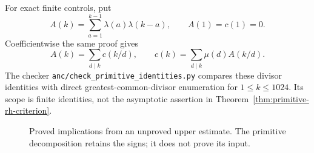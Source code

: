 For exact finite controls, put
\[
 A(k)=\sum_{a=1}^{k-1}\lambda(a)\lambda(k-a),\qquad A(1)=c(1)=0.
\]
Coefficientwise the same proof gives
\begin{equation}\label{eq:primitive-finite-controls}
 A(k)=\sum_{d\mid k}c(k/d),\qquad
 c(k)=\sum_{d\mid k}\mu(d)A(k/d).
\end{equation}
The checker \texttt{anc/check\_primitive\_identities.py} compares
these divisor identities with direct greatest-common-divisor
enumeration for $1\le k\le1024$. Its scope is finite identities,
not the asymptotic assertion in Theorem~\ref{thm:primitive-rh-criterion}.

\begin{figure}[tb]
\centering
{}
\caption{Proved implications from an unproved upper estimate. The
primitive decomposition retains the signs; it does not prove its input.}
\label{fig:primitive-criterion}
\end{figure}
